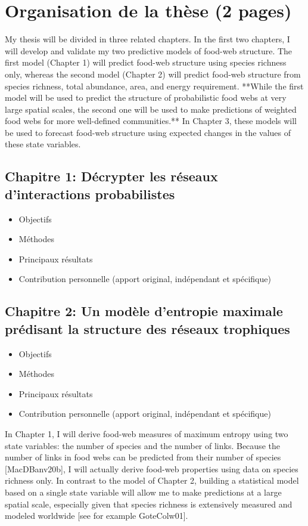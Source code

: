 
\section{Organisation de la thèse (2 pages)}

My thesis will be divided in three related chapters. In the first two chapters,
I will develop and validate my two predictive models of food-web structure. The
first model (Chapter 1) will predict food-web structure using species richness
only, whereas the second model (Chapter 2) will predict food-web structure from
species richness, total abundance, area, and energy requirement. **While the
first model will be used to predict the structure of probabilistic food webs at
very large spatial scales, the second one will be used to make predictions of
weighted food webs for more well-defined communities.** In Chapter 3, these
models will be used to forecast food-web structure using expected changes in the
values of these state variables.

\subsection{Chapitre 1: Décrypter les réseaux d'interactions probabilistes} 

\begin{itemize}
    \item Objectifs
    \item Méthodes 
    \item Principaux résultats
    \item Contribution personnelle (apport original, indépendant et spécifique)
\end{itemize}

\subsection{Chapitre 2: Un modèle d'entropie maximale prédisant la structure des réseaux trophiques} 

\begin{itemize}
    \item Objectifs
    \item Méthodes 
    \item Principaux résultats
    \item Contribution personnelle (apport original, indépendant et spécifique)
\end{itemize}

In Chapter 1, I will derive food-web measures of maximum entropy using two state
variables: the number of species and the number of links. Because the number of
links in food webs can be predicted from their number of species [MacDBanv20b],
I will actually derive food-web properties using data on species richness only.
In contrast to the model of Chapter 2, building a statistical model based on a
single state variable will allow me to make predictions at a large spatial
scale, especially given that species richness is extensively measured and
modeled worldwide [see for example GoteColw01].

